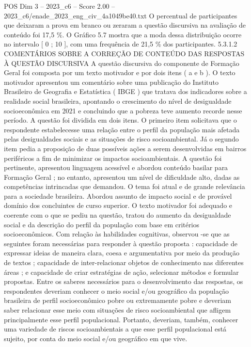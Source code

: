 \begin{textsample}{POS Dim 3 – 2023\_c6 – Score 2.00 – 2023\_c6/enade\_2023\_eng\_civ\_4a1049be40.txt}
O percentual de participantes que deixaram a prova em branco ou zeraram a questão discursiva na avaliação de conteúdo foi 17,5 \%.
O Gráfico 5.7 mostra que a moda dessa distribuição ocorre no intervalo [ 0 ; 10 ], com uma frequência de 21,5 \% dos participantes. 5.3.1.2 COMENTÁRIOS SOBRE A CORREÇÃO DE CONTEÚDO DAS RESPOSTAS À QUESTÃO DISCURSIVA A questão discursiva do componente de Formação Geral foi composta por um texto motivador e por dois itens ( a e b ).
O texto motivador apresentou um comentário sobre uma publicação do Instituto Brasileiro de Geografia e Estatística ( IBGE ) que tratava dos indicadores sobre a realidade social brasileira, apontando o crescimento do nível de desigualdade socioeconômica em 2021 e concluindo que a pobreza teve aumento recorde nesse período.
A questão foi dividida em dois itens.
O primeiro item solicitava que o respondente estabelecesse uma relação entre o perfil da população mais afetada pelas desigualdades sociais e as situações de risco socioambiental.
Já o segundo item pedia a proposição de duas possíveis ações a serem desenvolvidas em bairros periféricos a fim de minimizar os impactos socioambientais.
A questão foi pertinente, apresentou linguagem acessível e abordou conteúdo basilar para Formação Geral ; no entanto, apresentou um nível de dificuldade alto, dadas as competências intrincadas que demandou.
O tema foi atual e de grande relevância para a sociedade brasileira.
Abordou assunto de impacto social e de provável domínio dos concluintes de curso superior.
O texto motivador foi adequado e coerente com o que se pediu na questão, tratou do aumento da desigualdade social e da descrição do perfil da população com base em critérios socioeconômicos.
Com relação às habilidades cognitivas, observou -se que as seguintes foram necessárias para responder à questão proposta : capacidade de expressar ideias de maneira clara, coesa e argumentativa por meio da produção de textos ; capacidade de inter-relacionar objetos de conhecimento nas diferentes áreas ; e capacidade de criar estratégias de ação, selecionar métodos e formular propostas.
Entre os saberes necessários para o desenvolvimento das respostas, os respondentes deveriam conhecer o meio social e/ou geográfico da população brasileira de perfil socioeconômico pobre ou extremamente pobre e deveriam saber relacionar esse meio com situações de risco socioambiental que afligem principalmente esse perfil populacional.
Portanto, deveriam, também, conhecer uma variedade de riscos socioambientais a que esse perfil populacional está sujeito, por conta do meio social e/ou geográfico em que vive.

\end{textsample}
